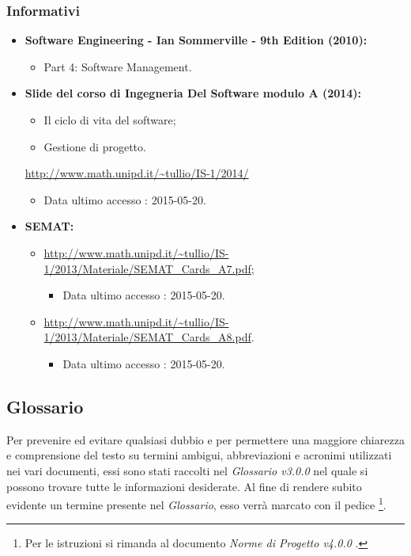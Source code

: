 \subsubsection{Informativi}
\label{sezione 1.2.2}
\begin{itemize}
	\item \textbf{Software Engineering - Ian Sommerville - 9th Edition (2010):} 
	\begin{itemize}
		\item Part 4: Software Management.
	\end{itemize}
	\item \textbf{\gls{Slide} del corso di Ingegneria Del Software modulo A (2014):} 
	\begin{itemize}
		\item Il ciclo di vita del software; 
		\item Gestione di progetto.
	\end{itemize}
	\url{http://www.math.unipd.it/~tullio/IS-1/2014/}
	\begin{itemize}
		\item Data ultimo accesso : 2015-05-20.						
	\end{itemize}
	\item \textbf{\gls{SEMAT}:}
	\begin{itemize}
		\item \url{http://www.math.unipd.it/~tullio/IS-1/2013/Materiale/SEMAT_Cards_A7.pdf};
		\begin{itemize}
			\item Data ultimo accesso : 2015-05-20.						
		\end{itemize}
		\item \url{http://www.math.unipd.it/~tullio/IS-1/2013/Materiale/SEMAT_Cards_A8.pdf}.
		\begin{itemize}
			\item Data ultimo accesso : 2015-05-20.						
		\end{itemize}	
	\end{itemize}
\end{itemize}

\subsection{Glossario}
Per prevenire ed evitare qualsiasi dubbio e per permettere una maggiore chiarezza e comprensione del testo su termini ambigui, abbreviazioni e acronimi utilizzati nei vari documenti, essi sono stati raccolti nel \textit{Glossario v3.0.0} nel quale si possono trovare tutte le informazioni desiderate.
Al fine di rendere subito evidente un termine presente nel \textit{Glossario}, esso verrà marcato con il pedice \G\footnote{Per le istruzioni si rimanda al documento \textit{Norme di Progetto v4.0.0} .}.

